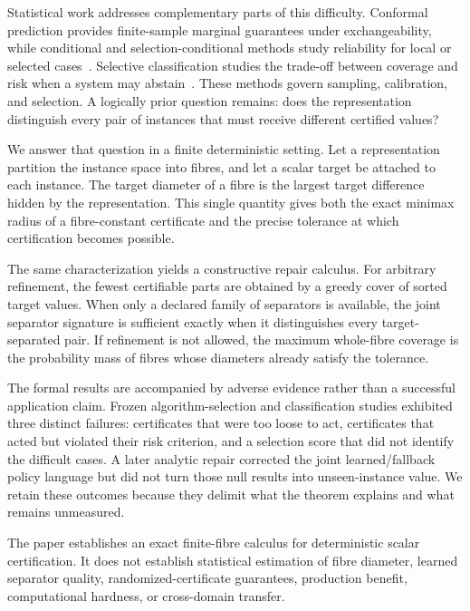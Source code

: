 \documentclass[10pt]{article}
\newcommand{\1}{\mathbf{1}}
\begin{document}
Statistical work addresses complementary parts of this difficulty. Conformal prediction provides finite-sample marginal guarantees under exchangeability, while conditional and selection-conditional methods study reliability for local or selected cases~\citep{vovk2005,angelopoulos2023,barber2021,jin2025,sale2025,zhou2026,min2026}. Selective classification studies the trade-off between coverage and risk when a system may abstain~\citep{elyaniv2010,geifman2017}. These methods govern sampling, calibration, and selection. A logically prior question remains: does the representation distinguish every pair of instances that must receive different certified values?

We answer that question in a finite deterministic setting. Let a representation partition the instance space into fibres, and let a scalar target be attached to each instance. The target diameter of a fibre is the largest target difference hidden by the representation. This single quantity gives both the exact minimax radius of a fibre-constant certificate and the precise tolerance at which certification becomes possible.

The same characterization yields a constructive repair calculus. For arbitrary refinement, the fewest certifiable parts are obtained by a greedy cover of sorted target values. When only a declared family of separators is available, the joint separator signature is sufficient exactly when it distinguishes every target-separated pair. If refinement is not allowed, the maximum whole-fibre coverage is the probability mass of fibres whose diameters already satisfy the tolerance.

The formal results are accompanied by adverse evidence rather than a successful application claim. Frozen algorithm-selection and classification studies exhibited three distinct failures: certificates that were too loose to act, certificates that acted but violated their risk criterion, and a selection score that did not identify the difficult cases. A later analytic repair corrected the joint learned/fallback policy language but did not turn those null results into unseen-instance value. We retain these outcomes because they delimit what the theorem explains and what remains unmeasured.

The paper establishes an exact finite-fibre calculus for deterministic scalar certification. It does not establish statistical estimation of fibre diameter, learned separator quality, randomized-certificate guarantees, production benefit, computational hardness, or cross-domain transfer.
\end{document}
